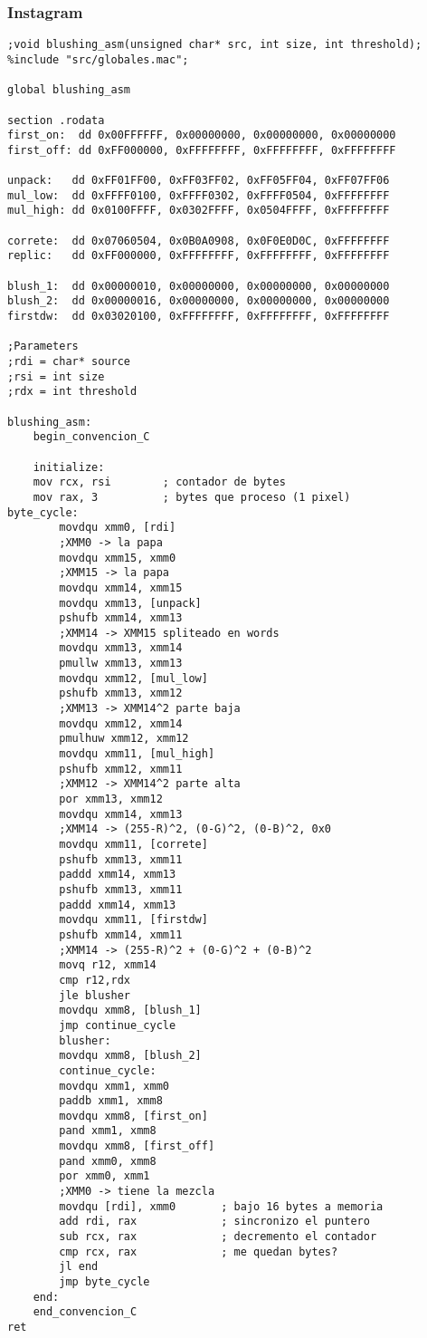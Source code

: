 \subsubsection{Instagram}
\begin{verbatim}
;void blushing_asm(unsigned char* src, int size, int threshold);
%include "src/globales.mac";

global blushing_asm

section .rodata
first_on:  dd 0x00FFFFFF, 0x00000000, 0x00000000, 0x00000000
first_off: dd 0xFF000000, 0xFFFFFFFF, 0xFFFFFFFF, 0xFFFFFFFF

unpack:   dd 0xFF01FF00, 0xFF03FF02, 0xFF05FF04, 0xFF07FF06
mul_low:  dd 0xFFFF0100, 0xFFFF0302, 0xFFFF0504, 0xFFFFFFFF
mul_high: dd 0x0100FFFF, 0x0302FFFF, 0x0504FFFF, 0xFFFFFFFF

correte:  dd 0x07060504, 0x0B0A0908, 0x0F0E0D0C, 0xFFFFFFFF
replic:   dd 0xFF000000, 0xFFFFFFFF, 0xFFFFFFFF, 0xFFFFFFFF

blush_1:  dd 0x00000010, 0x00000000, 0x00000000, 0x00000000
blush_2:  dd 0x00000016, 0x00000000, 0x00000000, 0x00000000
firstdw:  dd 0x03020100, 0xFFFFFFFF, 0xFFFFFFFF, 0xFFFFFFFF

;Parameters
;rdi = char* source
;rsi = int size
;rdx = int threshold

blushing_asm:
    begin_convencion_C

    initialize:
    mov rcx, rsi        ; contador de bytes
    mov rax, 3          ; bytes que proceso (1 pixel)
byte_cycle:
        movdqu xmm0, [rdi]
        ;XMM0 -> la papa
        movdqu xmm15, xmm0
        ;XMM15 -> la papa
        movdqu xmm14, xmm15
        movdqu xmm13, [unpack]
        pshufb xmm14, xmm13
        ;XMM14 -> XMM15 spliteado en words
        movdqu xmm13, xmm14
        pmullw xmm13, xmm13
        movdqu xmm12, [mul_low]
        pshufb xmm13, xmm12
        ;XMM13 -> XMM14^2 parte baja
        movdqu xmm12, xmm14
        pmulhuw xmm12, xmm12
        movdqu xmm11, [mul_high]
        pshufb xmm12, xmm11
        ;XMM12 -> XMM14^2 parte alta
        por xmm13, xmm12
        movdqu xmm14, xmm13
        ;XMM14 -> (255-R)^2, (0-G)^2, (0-B)^2, 0x0
        movdqu xmm11, [correte]
        pshufb xmm13, xmm11
        paddd xmm14, xmm13
        pshufb xmm13, xmm11
        paddd xmm14, xmm13
        movdqu xmm11, [firstdw]
        pshufb xmm14, xmm11
        ;XMM14 -> (255-R)^2 + (0-G)^2 + (0-B)^2
        movq r12, xmm14
        cmp r12,rdx
        jle blusher
        movdqu xmm8, [blush_1]
        jmp continue_cycle
        blusher:
        movdqu xmm8, [blush_2]
        continue_cycle:
        movdqu xmm1, xmm0
        paddb xmm1, xmm8
        movdqu xmm8, [first_on]
        pand xmm1, xmm8
        movdqu xmm8, [first_off]
        pand xmm0, xmm8
        por xmm0, xmm1
        ;XMM0 -> tiene la mezcla
        movdqu [rdi], xmm0       ; bajo 16 bytes a memoria
        add rdi, rax             ; sincronizo el puntero
        sub rcx, rax             ; decremento el contador
        cmp rcx, rax             ; me quedan bytes?
        jl end
        jmp byte_cycle
    end:
    end_convencion_C
ret

\end{verbatim}
